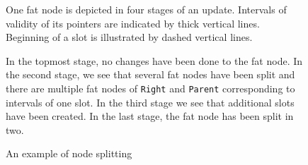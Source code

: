 \begin{figure}
\begin{center}
\vspace{10mm}

\caption{An example of node splitting}
\end{center}
One fat node is depicted in four stages of an update. Intervals of validity of its pointers are indicated by thick vertical lines. Beginning of a slot is illustrated by dashed vertical lines.

In the topmost stage, no changes have been done to the fat node. In the second stage, we see that several fat nodes have been split and there are multiple fat nodes of {\tt Right} and {\tt Parent} corresponding to intervals of one slot. In the third stage we see that additional slots have been created. In the last stage, the fat node has been split in two.
\end{figure}
